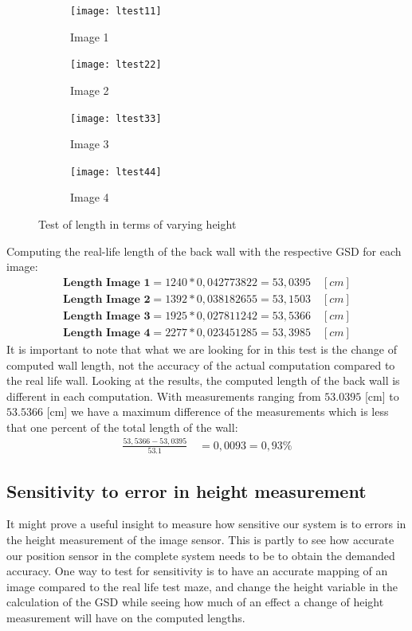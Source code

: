 \begin{figure}[h]
\begin{subfigure}{.5\textwidth}
  \centering
  \texttt{[image: ltest11]}
  \caption{Image 1}
\end{subfigure}
\begin{subfigure}{.5\textwidth}
  \centering
  \texttt{[image: ltest22]}
  \caption{Image 2}
\end{subfigure}
\begin{subfigure}{.5\textwidth}
  \centering
  \texttt{[image: ltest33]}
  \caption{Image 3}
\end{subfigure}
\begin{subfigure}{.5\textwidth}
  \centering
  \texttt{[image: ltest44]}
  \caption{Image 4}
\end{subfigure}
\caption{Test of length in terms of varying height}
\label{htest}
\end{figure}
Computing the real-life length of the back wall with the respective GSD for each image:
\begin{align*}
\textbf{Length Image 1} = 1240*0,042773822 = 53,0395\quad[cm]\\
\textbf{Length Image 2} = 1392*0,038182655 = 53,1503\quad[cm]\\
\textbf{Length Image 3} = 1925*0,027811242 = 53,5366\quad[cm]\\
\textbf{Length Image 4} = 2277*0,023451285 = 53,3985\quad[cm]
\end{align*}
It is important to note that what we are looking for in this test is the change of computed wall length, not the accuracy of the actual computation compared to the real life wall. Looking at the results, the computed length of the back wall is different in each computation. With measurements ranging from $53.0395$ [cm] to $53.5366$ [cm] we have a maximum difference of the measurements which is less that one percent of the total length of the wall:
\begin{align*}
\frac{53,5366-53,0395}{53.1}\quad= 0,0093 = 0,93\%
\end{align*}

\subsection{Sensitivity to error in height measurement}
It might prove a useful insight to measure how sensitive our system is to errors in the height measurement of the image sensor. This is partly to see how accurate our position sensor in the complete system needs to be to obtain the demanded accuracy. One way to test for sensitivity is to have an accurate mapping of an image compared to the real life test maze, and change the height variable in the calculation of the GSD while seeing how much of an effect a change of height measurement will have on the computed lengths.\\

